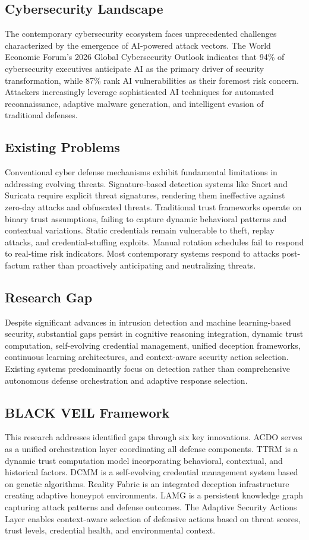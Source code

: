 \documentclass[12pt]{article}
\begin{document}
\subsection{Cybersecurity Landscape}
The contemporary cybersecurity ecosystem faces unprecedented challenges characterized by the emergence of AI-powered attack vectors. The World Economic Forum's 2026 Global Cybersecurity Outlook indicates that 94\% of cybersecurity executives anticipate AI as the primary driver of security transformation, while 87\% rank AI vulnerabilities as their foremost risk concern. Attackers increasingly leverage sophisticated AI techniques for automated reconnaissance, adaptive malware generation, and intelligent evasion of traditional defenses.

\subsection{Existing Problems}
Conventional cyber defense mechanisms exhibit fundamental limitations in addressing evolving threats. Signature-based detection systems like Snort and Suricata require explicit threat signatures, rendering them ineffective against zero-day attacks and obfuscated threats. Traditional trust frameworks operate on binary trust assumptions, failing to capture dynamic behavioral patterns and contextual variations. Static credentials remain vulnerable to theft, replay attacks, and credential-stuffing exploits. Manual rotation schedules fail to respond to real-time risk indicators. Most contemporary systems respond to attacks post-factum rather than proactively anticipating and neutralizing threats.

\subsection{Research Gap}
Despite significant advances in intrusion detection and machine learning-based security, substantial gaps persist in cognitive reasoning integration, dynamic trust computation, self-evolving credential management, unified deception frameworks, continuous learning architectures, and context-aware security action selection. Existing systems predominantly focus on detection rather than comprehensive autonomous defense orchestration and adaptive response selection.

\subsection{BLACK VEIL Framework}
This research addresses identified gaps through six key innovations. ACDO serves as a unified orchestration layer coordinating all defense components. TTRM is a dynamic trust computation model incorporating behavioral, contextual, and historical factors. DCMM is a self-evolving credential management system based on genetic algorithms. Reality Fabric is an integrated deception infrastructure creating adaptive honeypot environments. LAMG is a persistent knowledge graph capturing attack patterns and defense outcomes. The Adaptive Security Actions Layer enables context-aware selection of defensive actions based on threat scores, trust levels, credential health, and environmental context.
\end{document}
